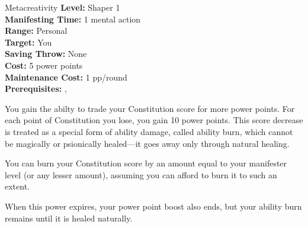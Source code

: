 {Metacreativity}
{
	\textbf{Level:}
	Shaper 1\\
	\textbf{Manifesting Time:}
	1 mental action\\
	\textbf{Range:}
	Personal\\
	\textbf{Target:}
	You\\
	\textbf{Saving Throw:}
	None\\
	\textbf{Cost:}
	5 power points\\
	\textbf{Maintenance Cost:}
	1 pp/round\\
	\textbf{Prerequisites:}
	, \\
}
{
	You gain the abilty to trade your Constitution score for more power points. For each point of Constitution you lose, you gain 10 power points. This score decrease is treated as a special form of ability damage, called ability burn, which cannot be magically or psionically healed---it goes away only through natural healing.

	You can burn your Constitution score by an amount equal to your manifester level (or any lesser amount), assuming you can afford to burn it to such an extent.

	When this power expires, your power point boost also ends, but your ability burn remains until it is healed naturally.
}
